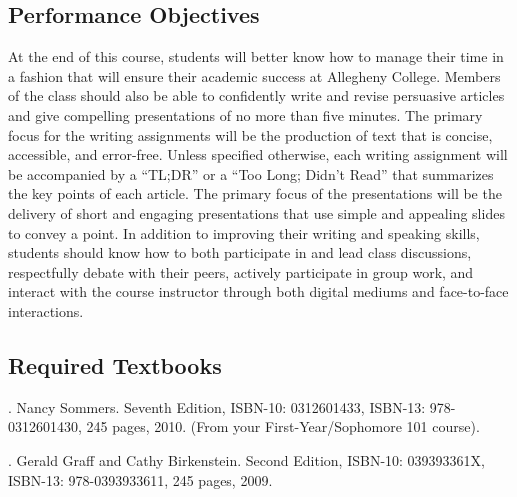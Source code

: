 \subsection*{Performance Objectives}

At the end of this course, students will better know how to manage their time in a fashion that will ensure their
academic success at Allegheny College. Members of the class should also be able to confidently write and revise
persuasive articles and give compelling presentations of no more than five minutes. The primary focus for the writing
assignments will be the production of text that is concise, accessible, and error-free. Unless specified otherwise, each
writing assignment will be accompanied by a ``TL;DR'' or a ``Too Long; Didn't Read'' that summarizes the key points of
each article. The primary focus of the presentations will be the delivery of short and engaging presentations that use
simple and appealing slides to convey a point. In addition to improving their writing and speaking skills, students
should know how to both participate in and lead class discussions, respectfully debate with their peers, actively
participate in group work, and interact with the course instructor through both digital mediums and face-to-face
interactions.

\subsection*{Required Textbooks}


  . Nancy Sommers. Seventh Edition, ISBN-10: 0312601433, ISBN-13: 978-0312601430,
  245 pages, 2010. (From your First-Year/Sophomore 101 course).


  . Gerald Graff and Cathy Birkenstein. Second Edition,
  ISBN-10: 039393361X, ISBN-13: 978-0393933611, 245 pages, 2009.


